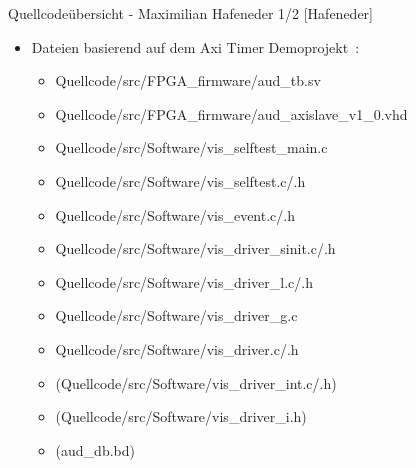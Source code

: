 \begin{frame}{Quellcodeübersicht - Maximilian Hafeneder 1/2 [Hafeneder] }
    \begin{itemize}
        \item Dateien basierend auf dem Axi Timer Demoprojekt~\cite{at_demoprojekt}:
            \begin{itemize}
                \item Quellcode/src/FPGA\_firmware/aud\_tb.sv 
                \item Quellcode/src/FPGA\_firmware/aud\_axislave\_v1\_0.vhd
                \item Quellcode/src/Software/vis\_selftest\_main.c
                \item Quellcode/src/Software/vis\_selftest.c/.h
                \item Quellcode/src/Software/vis\_event.c/.h
                \item Quellcode/src/Software/vis\_driver\_sinit.c/.h
                \item Quellcode/src/Software/vis\_driver\_l.c/.h
                \item Quellcode/src/Software/vis\_driver\_g.c
                \item Quellcode/src/Software/vis\_driver.c/.h
                \item (Quellcode/src/Software/vis\_driver\_int.c/.h)
                \item (Quellcode/src/Software/vis\_driver\_i.h)
                \item (aud\_db.bd)
            \end{itemize}
    \end{itemize}
\end{frame}
